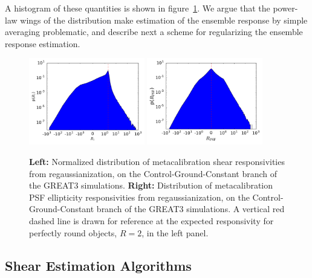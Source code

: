 \documentclass[iop]{emulateapj}
\begin{document}
A histogram of these quantities is shown in
figure~\ref{fig:calibhist}. We argue that the power-law wings of the
distribution make estimation of the ensemble response by simple
averaging problematic, and describe next a scheme for regularizing the
ensemble response estimation.

\begin{figure}
\begin{center}
\includegraphics[width=0.45\textwidth]{./Plots/R1_hist.pdf}
\includegraphics[width=0.45\textwidth]{./Plots/a1_hist.pdf}
\end{center}
\caption{{\bf Left:} Normalized distribution of metacalibration shear
  responsivities from regaussianization, on the
  Control-Ground-Constant branch of the GREAT3 simulations.  {\bf
    Right:} Distribution of metacalibration PSF ellipticity
  responsivities from regaussianization, on the
  Control-Ground-Constant branch of the GREAT3 simulations. A
  vertical red dashed line is drawn for reference at the expected
  responsivity for perfectly round objects, $R=2$, in the left
  panel. }
\label{fig:calibhist}
\end{figure}


\subsection{Shear Estimation Algorithms}
\end{document}
